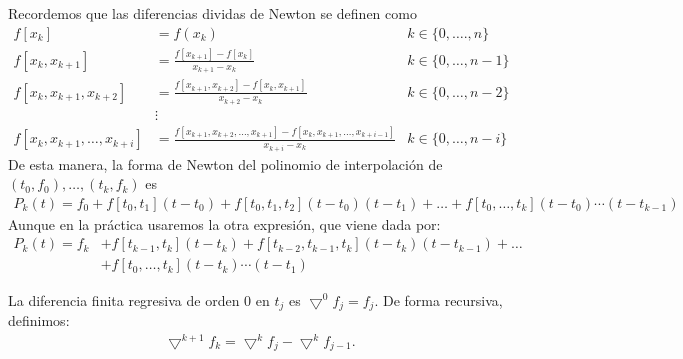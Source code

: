 Recordemos que las diferencias dividas de Newton se definen como
\begin{align*}
    f[x_k]                        & = f(x_k)                                                                                  & k \in \{0,\ldots.,n\}  \\
    f[x_k,x_{k+1}]                & = \frac{f[x_{k+1}] - f[x_k]}{x_{k+1} - x_k}                                               & k \in \{0,\ldots,n-1\} \\
    f[x_k,x_{k+1},x_{k+2}]        & = \frac{f[x_{k+1},x_{k+2}] - f[x_k,x_{k+1}]}{x_{k+2} - x_k}                               & k \in \{0,\ldots,n-2\} \\
                                  & \vdots                                                                                                             \\
    f[x_k,x_{k+1},\ldots,x_{k+i}] & = \frac{f[x_{k+1},x_{k+2},\ldots,x_{k+1}] - f[x_k,x_{k+1},\ldots,x_{k+i-1}]}{x_{k+i}-x_k} & k \in \{0,\ldots,n-i\}
\end{align*}
De esta manera, la forma de Newton del polinomio de interpolación de $(t_0,f_0),\ldots,(t_k,f_k)$ es
\begin{align*}
    P_k(t) = f_0 + f[t_0,t_1](t-t_0) + f[t_0,t_1,t_2](t-t_0)(t-t_1) + \ldots + f[t_0,\ldots,t_k](t-t_0)\cdots(t-t_{k-1})
\end{align*}
Aunque en la práctica usaremos la otra expresión, que viene dada por:
\begin{align*}
    P_k(t) = f_k & + f[t_{k-1},t_k](t-t_k) + f[t_{k-2},t_{k-1},t_k](t-t_k)(t-t_{k-1}) + \ldots \\
                 & + f[t_0,\ldots,t_k](t-t_k)\cdots (t-t_1)
\end{align*}

\begin{defi}
    La diferencia finita regresiva de orden 0 en $t_j$ es $\bigtriangledown^0f_j = f_j$. De forma recursiva, definimos:
    \begin{align*}
        \bigtriangledown^{k+1}f_k = \bigtriangledown^k f_j - \bigtriangledown^kf_{j-1}.
    \end{align*}
\end{defi}

